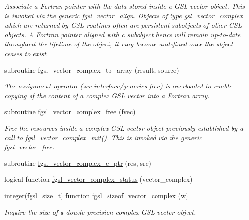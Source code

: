 \begin{DoxyCompactItemize}
\begin{DoxyCompactList}\small\item\em Associate a Fortran pointer with the data stored inside a G\+S\+L vector object. This is invoked via the generic \hyperlink{interfacefgsl__vector__align}{fgsl\+\_\+vector\+\_\+align}. Objects of type {\ttfamily gsl\+\_\+vector\+\_\+complex} which are returned by G\+S\+L routines often are persistent subobjects of other G\+S\+L objects. A Fortran pointer aligned with a subobject hence will remain up-\/to-\/date throughout the lifetime of the object; it may become undefined once the object ceases to exist. \end{DoxyCompactList}\item 
subroutine \hyperlink{array_8finc_ad9bc465224323cc4ecdcf56589bdfdbb}{fgsl\+\_\+vector\+\_\+complex\+\_\+to\+\_\+array} (result, source)
\begin{DoxyCompactList}\small\item\em The assignment operator (see \hyperlink{generics_8finc}{interface/generics.\+finc}) is overloaded to enable copying of the content of a complex G\+S\+L vector into a Fortran array. \end{DoxyCompactList}\item 
subroutine \hyperlink{array_8finc_a3a8d76f2fe0bb4c9687f06e5e33671b8}{fgsl\+\_\+vector\+\_\+complex\+\_\+free} (fvec)
\begin{DoxyCompactList}\small\item\em Free the resources inside a complex G\+S\+L vector object previously established by a call to \hyperlink{array_8finc_a71c83c0b1de4b3965b6b8d6efb28cf13}{fgsl\+\_\+vector\+\_\+complex\+\_\+init()}. This is invoked via the generic \hyperlink{interfacefgsl__vector__free}{fgsl\+\_\+vector\+\_\+free}. \end{DoxyCompactList}\item 
subroutine \hyperlink{array_8finc_a07419ff1eb431e5a8bf628d31099e9a7}{fgsl\+\_\+vector\+\_\+complex\+\_\+c\+\_\+ptr} (res, src)
\item 
logical function \hyperlink{array_8finc_a04dbf95001922f560a73333ca3d00f81}{fgsl\+\_\+vector\+\_\+complex\+\_\+status} (vector\+\_\+complex)
\item 
integer(fgsl\+\_\+size\+\_\+t) function \hyperlink{array_8finc_af8cb8c5be9be9e6604200da0845dc18d}{fgsl\+\_\+sizeof\+\_\+vector\+\_\+complex} (w)
\begin{DoxyCompactList}\small\item\em Inquire the size of a double precision complex G\+S\+L vector object. \end{DoxyCompactList}\item 

\end{DoxyCompactItemize}
